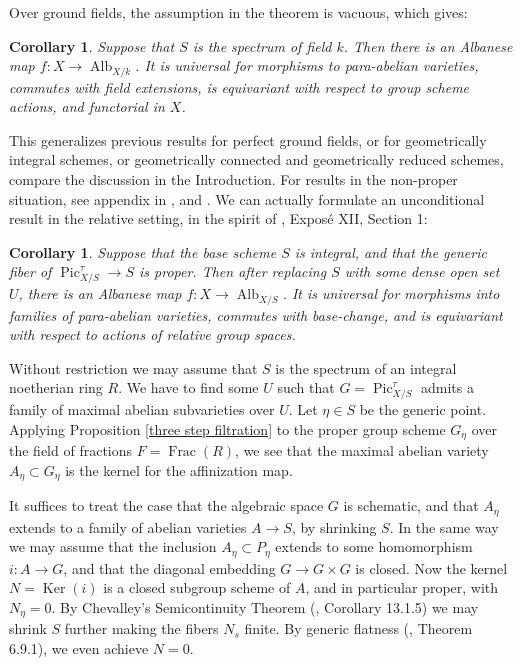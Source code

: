 \documentclass[oneside, 12pt]{amsart}
\newcommand\mylabel[1]{\label{#1}\marginpar{\raggedright\vspace{-1ex}\medskip\medskip\footnotesize \tt #1}}
\renewcommand\mylabel[1]{\label{#1}}
\newtheorem{corollary}[theorem]{Corollary}
\theoremstyle{definition}
\theoremstyle{remark}
\newcommand{\Alb}{\operatorname{Alb}}
\newcommand{\Frac}{\operatorname{Frac}}
\newcommand{\Kernel}{\operatorname{Ker}}
\newcommand{\Pic}{\operatorname{Pic}}
\newcommand{\ra}{\rightarrow}
\begin{document}
Over ground fields, the assumption in the theorem is vacuous, which gives:

\begin{corollary}
\mylabel{albanese over field}
Suppose that $S $ is the spectrum of  field $k$. Then there is an Albanese map $f:X\ra \Alb_{X/k}$. It is  universal for
morphisms to para-abelian varieties, commutes with field extensions, is equivariant with respect to group scheme actions,
and functorial in $X$.
\end{corollary}

This generalizes previous results for perfect ground fields,  or for geometrically integral schemes,
or geometrically connected and geometrically reduced schemes, compare the discussion in the Introduction.
For results in the non-proper situation,  see appendix in \cite{Wittenberg 2008}, \cite{Achter; Casalaina-Martin; Vial 2022}
and \cite{Schroeer 2022}.
 We can actually formulate an unconditional result in the relative setting, in the spirit of  \cite{SGA 6}, Expos\'e XII, Section 1:

\begin{corollary}
\mylabel{albanese over open}
Suppose that the base scheme $S$ is integral, and that the generic fiber of $\Pic^\tau_{X/S}\ra S$ is proper.
Then after replacing $S$ with some dense open set $U$, there is an  Albanese map $f:X\ra \Alb_{X/S}$. It is  universal for
morphisms into families of para-abelian varieties, commutes with base-change, and is equivariant with respect to actions of relative
group spaces.
\end{corollary}

\proof
Without restriction we may assume that $S$ is the spectrum of an integral noetherian ring $R$.
We have to find some $U$ such that $G=\Pic^\tau_{X/S}$ admits a family of maximal abelian subvarieties over $U$.
Let $\eta\in S$ be the generic point.
Applying Proposition \ref{three step filtration} to the proper group scheme $G_\eta$ over the field of fractions $F=\Frac(R)$,
we see that the maximal abelian variety $A_\eta\subset G_\eta$ is the kernel for the affinization map.

It suffices to treat the case that the algebraic space $G$ 
is schematic, and that $A_\eta$ extends to a family of abelian varieties $A\ra S$,
by shrinking $S$.
In the same way we may assume that the inclusion $A_\eta\subset P_\eta$
extends to some homomorphism $i:A\ra G$, and that the diagonal embedding $G\ra G\times G$ is closed.
Now the kernel  $N=\Kernel(i)$ is a closed subgroup scheme of $A$,
and in particular proper, with $N_\eta=0$. By Chevalley's Semicontinuity Theorem (\cite{EGA IVc}, Corollary 13.1.5)
we may shrink $S$ further making the fibers $N_s$ finite. By generic flatness (\cite{EGA IVb}, Theorem 6.9.1), we even achieve $N=0$.
\end{document}
